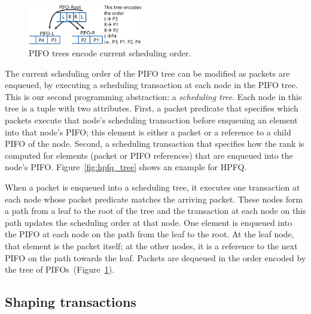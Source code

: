 \begin{figure}
\centering
\includegraphics[width=0.45\textwidth]{pifo_pifo_tree_encoding.pdf}
\caption{PIFO trees encode current scheduling order.}
\label{fig:pifo_encoding}
\end{figure}


The current scheduling order of the PIFO tree can be modified as
packets are enqueued, by executing a scheduling transaction at each
node in the PIFO tree. This is our second programming abstraction: a
{\em scheduling tree}.  Each node in this tree is a tuple with two
attributes. First, a packet predicate that specifies which packets
execute that node's scheduling transaction before enqueuing an
element into that node's PIFO; this element is either a packet or a
reference to a child PIFO of the node.  Second, a scheduling
transaction that specifies how the rank is computed for elements
(packet or PIFO references) that are enqueued into the node's
PIFO. Figure~\ref{fig:hpfq_tree} shows an example for HPFQ.

When a packet is enqueued into a scheduling tree, it executes one
transaction at each node whose packet predicate matches the arriving
packet. These nodes form a path from a leaf to the root of the tree
and the transaction at each node on this path updates the scheduling
order at that node. One element is enqueued into the PIFO at each node
on the path from the leaf to the root. At the leaf node, that element
is the packet itself; at the other nodes, it is a reference to the
next PIFO on the path towards the leaf. Packets are dequeued in the
order encoded by the tree of PIFOs~(Figure~\ref{fig:pifo_encoding}).

\subsection{Shaping transactions}
\label{ss:hshaping}

